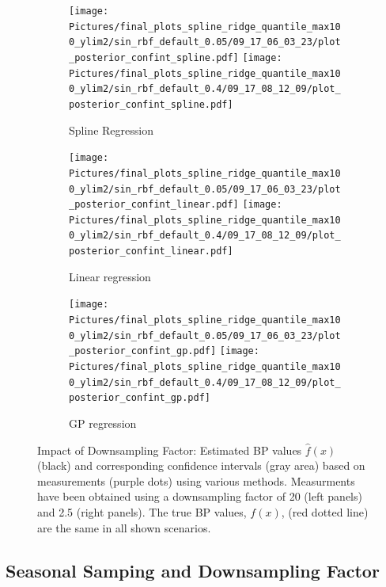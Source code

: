 \begin{figure}
\begin{subfigure}{\textwidth}
    \centering
    \texttt{[image: 
        Pictures/final\_plots\_spline\_ridge\_quantile\_max100\_ylim2/sin\_rbf\_default\_0.05/09\_17\_06\_03\_23/plot\_posterior\_confint\_spline.pdf]}
    \texttt{[image: 
    Pictures/final\_plots\_spline\_ridge\_quantile\_max100\_ylim2/sin\_rbf\_default\_0.4/09\_17\_08\_12\_09/plot\_posterior\_confint\_spline.pdf]}
  \caption{Spline Regression }
\end{subfigure}

\begin{subfigure}{\textwidth}
    \centering
    \texttt{[image: 
        Pictures/final\_plots\_spline\_ridge\_quantile\_max100\_ylim2/sin\_rbf\_default\_0.05/09\_17\_06\_03\_23/plot\_posterior\_confint\_linear.pdf]}
    \texttt{[image: 
  Pictures/final\_plots\_spline\_ridge\_quantile\_max100\_ylim2/sin\_rbf\_default\_0.4/09\_17\_08\_12\_09/plot\_posterior\_confint\_linear.pdf]}
  \caption{Linear regression }
\end{subfigure}

\begin{subfigure}{\textwidth}
    \centering
    \texttt{[image: 
        Pictures/final\_plots\_spline\_ridge\_quantile\_max100\_ylim2/sin\_rbf\_default\_0.05/09\_17\_06\_03\_23/plot\_posterior\_confint\_gp.pdf]}
    \texttt{[image: 
  Pictures/final\_plots\_spline\_ridge\_quantile\_max100\_ylim2/sin\_rbf\_default\_0.4/09\_17\_08\_12\_09/plot\_posterior\_confint\_gp.pdf]}
  \caption{GP regression}
\end{subfigure}\hfill

\caption[Impact of Downsampling Factor]{Impact of Downsampling Factor:
    Estimated BP values $\hat{f}(x)$ (black) and corresponding confidence intervals
    (gray area) based on measurements (purple dots) using various methods.
    Measurments have been obtained using a
    downsampling factor of 20 (left panels) and 2.5 (right panels).
    The true BP values, $f(x)$, (red dotted line) are the same in all shown
    scenarios.
    }
\label{fig:ex-downsampling-factor}
\end{figure}

\subsection{Seasonal Samping and Downsampling Factor}


